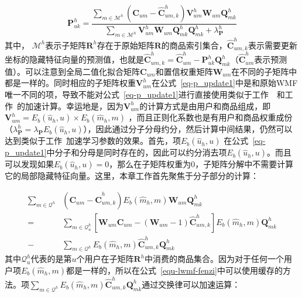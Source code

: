 \begin{equation}
\label{eq-p_update1}
\mathbf{P}_{uk}^h = \frac{\sum_{m\in \mathcal{M}^h}(\mathbf{C}_{um}-\mathbf{\hat{C}}_{um,k}^h)\mathbf{V}_{um}^h\mathbf{W}_{um}\mathbf{Q}_{mk}^h}{\sum_{m\in \mathcal{M}^h}\mathbf{V}_{um}^h\mathbf{W}_{um}\mathbf{Q}_{mk}^h\mathbf{Q}_{mk}^h+\lambda_\mathbf{P}^h}
\end{equation}
其中， $\mathcal{M}^h$表示子矩阵$\mathbf{R}^h$存在于原始矩阵$\mathbf{R}$的商品索引集合，$\mathbf{\hat{C}}_{um,k}^h$表示需要更新坐标的隐藏特征向量的预测值，也就是$\mathbf{\hat{C}}_{um,k}^h = \mathbf{\hat{C}}_{um}^h-\mathbf{P}_{uk}^h\mathbf{Q}_{mk}^h$（$\mathbf{\hat{C}}_{um}^h$表示预测值）。可以注意到全局二值化拟合矩阵$\mathbf{C}_{um}$和置信权重矩阵$\mathbf{W}_{um}$在不同的子矩阵中都是一样的。同时相应的子矩阵权重$\mathbf{V}_{um}^h$在公式~\ref{eq-p_update1}中是和原始WMF唯一不同的项，导致不能对公式~\ref{eq-p_update1}进行直接使用类似于工作~~\cite{hu2008collaborative}和工作~\cite{he2016fast}的加速计算。幸运地是，因为$\mathbf{V}_{um}^h$的计算方式是由用户和商品组成，即$\mathbf{V}^h_{um} = \mathit{E_{b}}(\hat{u}_h, u)\times\mathit{E_{b}}(\hat{m}_h, m)$ ，而且正则化系数也是有用户和商品权重成份（$\lambda_\mathbf{P}^h = \lambda_\mathbf{P}\mathit{E_{b}}(\hat{u}_h, u)$），因此通过分子分母约分，然后计算中间结果，仍然可以达到类似于工作~\cite{he2016fast}加速学习参数的效果。首先，项$\mathit{E_{b}}(\hat{u}_h, u)$ 在公式~\ref{eq-p_update1}中分子和分母是同时存在的，因此可以约分消去项$\mathit{E_{b}}(\hat{u}_h, u)$。而且可以发现如果$\mathit{E_{b}}(\hat{u}_h, u)=0$，那么在子矩阵权重为0，子矩阵分解中不需要计算它的局部隐藏特征向量。这里，本章工作首先聚焦于分子部分的计算：

\begin{align}
\label{equ-lwmf-fenzi}
\sum_{m\in \mathcal{Q}^h}&(\mathbf{C}_{um}-\mathbf{\hat{C}}_{um,k}^h)\mathit{E_{b}}(\hat{m}_h, m)\mathbf{W}_{um}\mathbf{Q}_{mk}^h \nonumber \\
=&\sum_{m\in \mathcal{Q}_u^h}[\mathbf{W}_{um}\mathbf{C}_{um}-(\mathbf{W}_{um}-1)\mathbf{\hat{C}}_{um,k}^h]\mathit{E_{b}}(\hat{m}_h, m)\mathbf{Q}_{mk}^h\nonumber \\
-&\sum_{m\in \mathcal{Q}^h}\mathit{E_{b}}(\hat{m}_h, m)\mathbf{\hat{C}}_{um,k}^h\mathbf{Q}_{mk}^h
\end{align}
其中$\mathcal{Q}_u^h$代表的是第$u$个用户在子矩阵$\mathbf{R}^h$中消费的商品集合。因为对于任何一个用户项$\mathit{E_{b}}(\hat{m}_h, m)$都是一样的，所以在公式~\ref{equ-lwmf-fenzi}中可以使用缓存的方法。项$\sum_{m\in \mathcal{Q}^h}\mathit{E_{b}}(\hat{m}_h, m)\mathbf{\hat{C}}_{um,k}^h\mathbf{Q}_{mk}^h$通过交换律可以加速运算：

